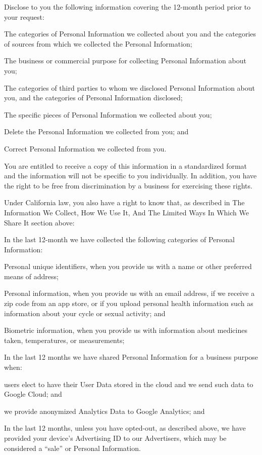 Disclose to you the following information covering the 12-month period prior to your request:

The categories of Personal Information we collected about you and the categories of sources from which we collected the Personal Information;

The business or commercial purpose for collecting Personal Information about you;

The categories of third parties to whom we disclosed Personal Information about you, and the categories of Personal Information disclosed;

The specific pieces of Personal Information we collected about you;

Delete the Personal Information we collected from you; and

Correct Personal Information we collected from you.

You are entitled to receive a copy of this information in a standardized format and the ‎information will not be specific to you individually. In addition, you have the right to be free from discrimination by a business for exercising these rights.

Under California law, you also have a right to know that, as described in The Information We Collect, How We Use It, And The Limited Ways In Which We Share It section above:

In the last 12-month we have collected the following categories of Personal Information: 

Personal unique identifiers, when you provide us with a name or other preferred means of address;

Personal information, when you provide us with an email address, if we receive a zip code from an app store, or if you upload personal health information such as information about your cycle or sexual activity; and

Biometric information, when you provide us with information about medicines taken, temperatures, or measurements;

In the last 12 months we have shared Personal Information for a business purpose when:

users elect to have their User Data stored in the cloud and we send such data to Google Cloud; and

we provide anonymized Analytics Data to Google Analytics; and

In the last 12 months, unless you have opted-out, as described above, we have provided your device’s Advertising ID to our Advertisers, which may be considered a “sale” or Personal Information.

